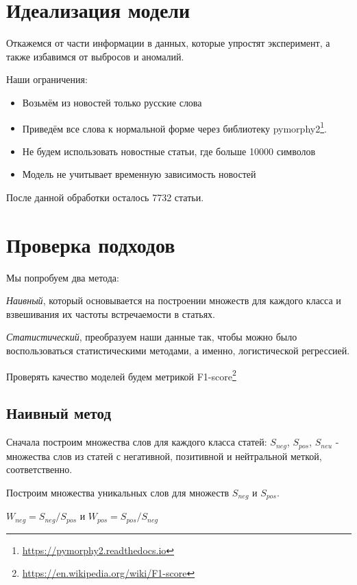 \documentclass[12pt]{article}
\begin{document}
        
    \section{Идеализация модели}
        Откажемся от части информации в данных, которые упростят эксперимент, а также избавимся 
        от выбросов и аномалий. 
        
        Наши ограничения:
        \begin{itemize}
            \item Возьмём из новостей только русские слова
            \item Приведём все слова к нормальной форме через библиотеку pymorphy2\footnote{\href{https://pymorphy2.readthedocs.io}{https://pymorphy2.readthedocs.io}}.
            \item Не будем использовать новостные статьи, где больше 10000 символов
            \item Модель не учитывает временную зависимость новостей
        \end{itemize}

        После данной обработки осталось 7732 статьи.

    \section{Проверка подходов}
        Мы попробуем два метода: 
        
        \textit{Наивный}, который основывается на построении множеств для каждого класса и взвешивания их 
        частоты встречаемости в статьях. 
        
        \textit{Статистический}, преобразуем наши данные так, чтобы можно было 
        воспользоваться статистическими методами, а именно, логистической регрессией.

        Проверять качество моделей будем метрикой F1-score\footnote{\href{https://en.wikipedia.org/wiki/F1\_score}{https://en.wikipedia.org/wiki/F1-score}}

        \subsection{Наивный метод}
            Сначала построим множества слов для каждого класса статей: $S_{neg}$,
            $S_{pos}$, $S_{neu}$ - множества слов из статей с негативной, 
            позитивной и нейтральной меткой, соответственно.

            Построим множества уникальных слов для множеств $S_{neg}$ и $S_{pos}$.
            \begin{center}
                $W_{neg} = S_{neg} / S_{pos}$ и $W_{pos} = S_{pos} / S_{neg}$
            \end{center}
\end{document}
